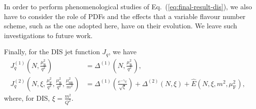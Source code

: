 \documentclass[letterpaper,11pt]{article}
\newcommand{\muf}{\mu_{\text{F}}}
\newcommand{\mur}{\mu_{\text{R}}}
\newcommand{\muOr}{\mu_{0\text{R}}}
\begin{document}
In order to perform phenomenological studies of Eq.~(\ref{eq:final-result-dis}), we also have to consider the role of PDFs and the effects that a variable flavour number scheme, such as the one adopted here, have on their evolution. We leave such investigations to future work. 

Finally, for the DIS jet function $J_q$, we have
\begin{equation}
	\begin{split}
	\label{eq:JqDISfinal}
J_q^{(1)}\left(N,\frac{\mur^2}{q^2}\right)&= \Delta^{(1)}\left(N,\frac{\mur^2}{q^2}\right), \\
 J_q^{(2)}\left(N,\xi,\frac{\muf^2}{q^2},\frac{\mur^2}{q^2},\frac{\muOr^2}{m^2}\right)&= \Delta^{(1)}\left(\frac{e^{-\gamma_E}}{\sqrt{\xi}} \right)+\Delta^{(2)}(N,\xi)+\hat E \left(N,\xi,m^2,\muf^2\right),
\end{split}
\end{equation}
where, for DIS, $\xi=\frac{m^2}{Q^2}$.





\end{document}
